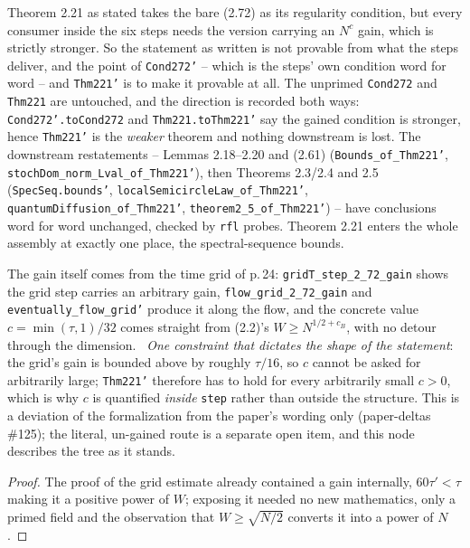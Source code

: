\begin{theorem}\label{thm:thm221-gain}
  \leanok{}
  Theorem 2.21 as stated takes the bare (2.72) as its regularity condition, but every consumer
  inside the six steps needs the version carrying an $N^c$ gain, which is strictly stronger.  So
  the statement as written is not provable from what the steps deliver, and the point of
  \texttt{Cond272'} -- which is the steps' own condition word for word -- and \texttt{Thm221'} is
  to make it provable at all.  The unprimed \texttt{Cond272} and \texttt{Thm221} are untouched,
  and the direction is recorded both ways: \texttt{Cond272'.toCond272} and
  \texttt{Thm221.toThm221'} say the gained condition is stronger, hence \texttt{Thm221'} is the
  \emph{weaker} theorem and nothing downstream is lost.  The downstream restatements --
  Lemmas 2.18--2.20 and (2.61) (\texttt{Bounds\_of\_Thm221'},
  \texttt{stochDom\_norm\_Lval\_of\_Thm221'}), then Theorems 2.3/2.4 and 2.5
  (\texttt{SpecSeq.bounds'}, \texttt{localSemicircleLaw\_of\_Thm221'},
  \texttt{quantumDiffusion\_of\_Thm221'}, \texttt{theorem2\_5\_of\_Thm221'}) -- have conclusions
  word for word unchanged, checked by \texttt{rfl} probes.  Theorem 2.21 enters the whole assembly
  at exactly one place, the spectral-sequence bounds.

  The gain itself comes from the time grid of p.\,24: \texttt{gridT\_step\_2\_72\_gain} shows the
  grid step carries an arbitrary gain, \texttt{flow\_grid\_2\_72\_gain} and
  \texttt{eventually\_flow\_grid'} produce it along the flow, and the concrete value
  $c=\min(\tau,1)/32$ comes straight from (2.2)'s $W\ge N^{1/2+c_B}$, with no detour through the
  dimension.  \ \emph{One constraint that dictates the shape of the statement}: the grid's gain is
  bounded above by roughly $\tau/16$, so $c$ cannot be asked for arbitrarily large; \texttt{Thm221'}
  therefore has to hold for every arbitrarily small $c>0$, which is why $c$ is quantified
  \emph{inside} \texttt{step} rather than outside the structure.  This is a deviation of the
  formalization from the paper's wording only (paper-deltas \#125); the literal, un-gained route
  is a separate open item, and this node describes the tree as it stands.
\end{theorem}
\begin{proof}\leanok
  The proof of the grid estimate already contained a gain internally, $60\tau'<\tau$ making it a
  positive power of $W$; exposing it needed no new mathematics, only a primed field and the
  observation that $W\ge\sqrt{N/2}$ converts it into a power of $N$.
\end{proof}

